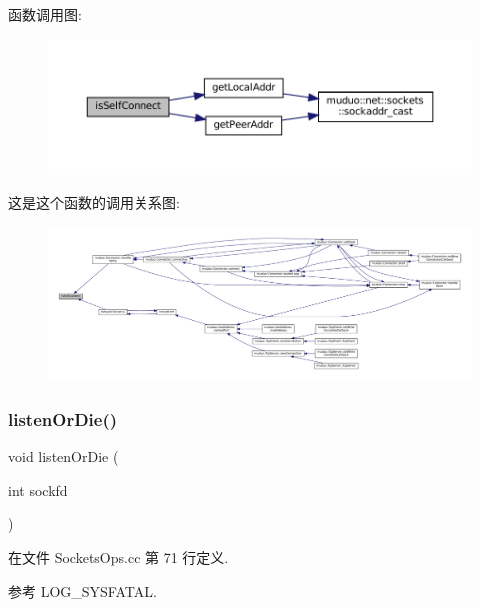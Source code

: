 函数调用图\+:
\nopagebreak
\begin{figure}[H]
\begin{center}
\leavevmode
\includegraphics[width=350pt]{namespacemuduo_1_1sockets_ae3b7d08b5cb176e9d67580a0a1fd57fb_cgraph}
\end{center}
\end{figure}
这是这个函数的调用关系图\+:
\nopagebreak
\begin{figure}[H]
\begin{center}
\leavevmode
\includegraphics[width=350pt]{namespacemuduo_1_1sockets_ae3b7d08b5cb176e9d67580a0a1fd57fb_icgraph}
\end{center}
\end{figure}
\mbox{\label{namespacemuduo_1_1sockets_a379cec5f383764a3696d9615bd344529}} 
\subsubsection{\texorpdfstring{listen\+Or\+Die()}{listenOrDie()}}
{\footnotesize\ttfamily void listen\+Or\+Die (\begin{DoxyParamCaption}\item[{int}]{sockfd }\end{DoxyParamCaption})}



在文件 Sockets\+Ops.\+cc 第 71 行定义.



参考 L\+O\+G\+\_\+\+S\+Y\+S\+F\+A\+T\+AL.



